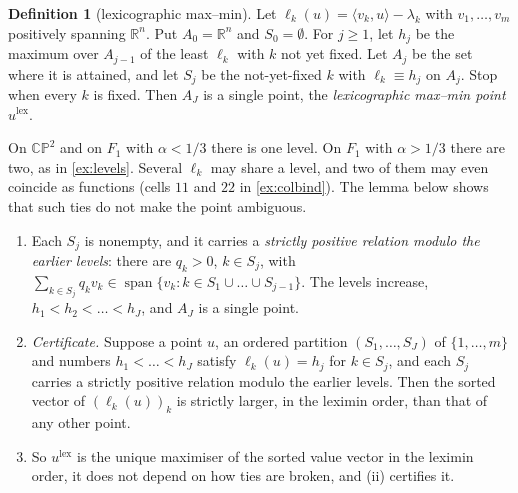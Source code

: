 \documentclass[11pt]{article}
\theoremstyle{definition}\newtheorem{definition}[theorem]{Definition}\newtheorem{remark}[theorem]{Remark}\newtheorem{example}[theorem]{Example}\newtheorem{problem}[theorem]{Open problem}\crefname{problem}{Problem}{Problems}
\newcommand{\R}{\mathbb R}
\begin{document}
\begin{definition}[lexicographic max--min]\label{def:lex}
Let $\ell_k(u)=\langle v_k,u\rangle-\lambda_k$ with $v_1,\dots,v_m$ positively spanning $\R^n$. Put $A_0=\R^n$ and $S_0=\emptyset$. For $j\ge1$, let $h_j$ be the maximum over $A_{j-1}$ of the least $\ell_k$ with $k$ not yet
fixed. Let $A_j$ be the set where it is attained, and let $S_j$ be the not-yet-fixed $k$ with $\ell_k\equiv h_j$ on $A_j$. Stop when every $k$ is fixed. Then $A_J$ is a single point, the
\emph{lexicographic max--min point} $u^{\mathrm{lex}}$.
\end{definition}

On $\mathbb{CP}^2$ and on $F_1$ with $\alpha<1/3$ there is one level. On $F_1$ with $\alpha>1/3$ there are two, as in \cref{ex:levels}. Several $\ell_k$ may share a level, and two of them may even coincide as
functions (cells $11$ and $22$ in \cref{ex:colbind}). The lemma below shows that such ties do not make the point ambiguous.

\begin{lemma}\label{lem:lexunique}
\begin{enumerate}
\item[(i)] Each $S_j$ is nonempty, and it carries a \emph{strictly positive relation modulo the earlier levels}: there are $q_k>0$, $k\in S_j$, with $\sum_{k\in S_j}q_kv_k\in\operatorname{span}\{v_k:k\in S_1\cup\dots\cup S_{j-1}\}$. The levels increase, $h_1<h_2<\dots<h_J$, and $A_J$ is a single point.
\item[(ii)] \emph{Certificate.} Suppose a point $u$, an ordered partition $(S_1,\dots,S_J)$ of $\{1,\dots,m\}$ and numbers $h_1<\dots<h_J$ satisfy $\ell_k(u)=h_j$ for $k\in S_j$, and each $S_j$ carries a strictly positive relation modulo the earlier levels. Then the sorted vector of $(\ell_k(u))_k$ is strictly larger, in the leximin order, than that of any other point.
\item[(iii)] So $u^{\mathrm{lex}}$ is the unique maximiser of the sorted value vector in the leximin order, it does not depend on how ties are broken, and (ii) certifies it.
\end{enumerate}
\end{lemma}
\end{document}
